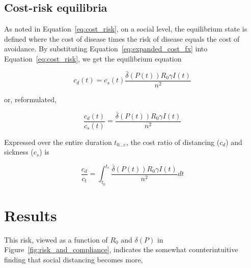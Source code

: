 \documentclass{article}
\begin{document}

\subsection{Cost-risk equilibria} %
\label{sub:cost_risk_equilibria}

As noted in Equation~\eqref{eq:cost_risk}, on a social level, the equilibrium state is defined where the cost of disease times the risk of disease equals the cost of avoidance. By substituting Equation~\eqref{eq:expanded_cost_fx} into Equation~\eqref{eq:cost_risk}, we get the equilibrium equation

\begin{equation}
	c_d(t) = c_s(t) \frac{\bar{\delta}(P(t)) R_0 \gamma I(t)}{n^2}
\end{equation}

\noindent or, reformulated, 

\begin{equation}
	\frac{c_d(t)}{c_s(t)} = \frac{\bar{\delta}(P(t)) R_0 \gamma I(t)}{n^2}
\end{equation}

Expressed over the entire duration $t_{0 \ldots e}$, the cost ratio of distancing ($c_d$) and sickness ($c_s$) is

\begin{equation}
	\frac{c_d}{c_t} = \int_{t_0}^{t_e} \frac{\bar{\delta}(P(t)) R_0 \gamma I(t)}{n^2} dt
\end{equation}



\section{Results} %
\label{sec:results}




This risk, viewed as a function of $R_0$ and $\delta(P)$ in Figure~\ref{fig:risk_and_compliance}, indicates the somewhat counterintuitive finding that social distancing becomes more, 




\end{document}
